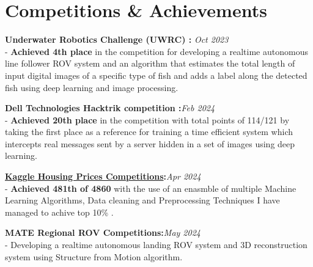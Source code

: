 \documentclass[letterpaper,11pt]{article}
\newcommand{\resumeSubHeadingListStart}{\begin{itemize}[leftmargin=0.15in, label={}]}
\newcommand{\resumeSubHeadingListEnd}{\end{itemize}}
\begin{document}

\section{Competitions \& Achievements}
  \vspace{2pt}
  \resumeSubHeadingListStart
    {\item[\scaleobj{0.6}{\bullet}]{
        \textbf{Underwater Robotics Challenge (UWRC) :} \hfill\textit{Oct 2023}\\
        - \small{\textbf{Achieved 4th place} in the competition for developing a realtime autonomous line follower ROV system and an algorithm that estimates the total length of input digital images of a specific type of fish and adds a label along the detected fish using deep learning and image processing.} \\ \vspace{3pt}
    }}
    {\item[\scaleobj{0.6}{\bullet}]{
      \textbf{Dell Technologies Hacktrik competition :}\hfill\textit{Feb 2024}\\
      - \small{\textbf{Achieved 20th place} in the competition with total points of 114/121 by taking the first place as a reference for training a time efficient system which intercepts real messages sent by a server hidden in a set of images using deep learning.} \\ \vspace{3pt}

    }}
    {\item[\scaleobj{0.6}{\bullet}]{
		\textbf{\href{https://www.kaggle.com/code/tommy011/top-10-houses-prices-using-pycaret}{{Kaggle Housing Prices Competitions}}:}\hfill\textit{Apr 2024}\\
		- \small{ \textbf{Achieved 481th of 4860} with the use of an enasmble of multiple Machine Learning Algorithms, Data cleaning and  Preprocessing Techniques I have managed to achive top 10\% .} \\ \vspace{3pt}
	}}
    {\item[\scaleobj{0.6}{\bullet}]{
      \textbf{MATE Regional ROV Competitions:}\hfill\textit{May 2024}\\
    - \small{ Developing a realtime autonomous landing ROV system and 3D reconstruction system using Structure from Motion algorithm.} \\ \vspace{3pt}
    }}
  \resumeSubHeadingListEnd
\end{document}
